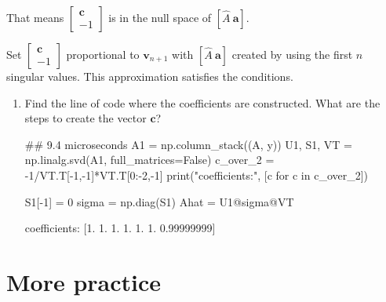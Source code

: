 \documentclass[12pt,letterpaper,noanswers]{exam}
\begin{document}
That means $\left[\begin{array}{r} \mathbf{c} \\ -1 \end{array}\right]$ is in the null space of $[\hat{A} \ \mathbf{a}]$.

Set $\left[\begin{array}{r} \mathbf{c} \\ -1 \end{array}\right]$ proportional to $\mathbf{v}_{n+1}$ with $[\hat{A} \ \mathbf{a}]$ created by using the first $n$ singular values.  This approximation satisfies the conditions.


\begin{enumerate}[resume]
\item Find the line of code where the coefficients are constructed.  What are the steps to create the vector $\mathbf{c}$?

\begin{pyin}
\## 9.4 microseconds
A1 = np.column_stack((A, y))
U1, S1, VT = np.linalg.svd(A1, full_matrices=False)
c_over_2 = -1/VT.T[-1,-1]*VT.T[0:-2,-1]
print("coefficients:", [c for c in c_over_2])

S1[-1] = 0
sigma = np.diag(S1)
Ahat = U1@sigma@VT
\end{pyin}

\begin{pyout}
coefficients: [1. 1.  1.  1. 1. 1. 0.99999999]
\end{pyout}

\end{enumerate}

\section{More practice}
\end{document}
